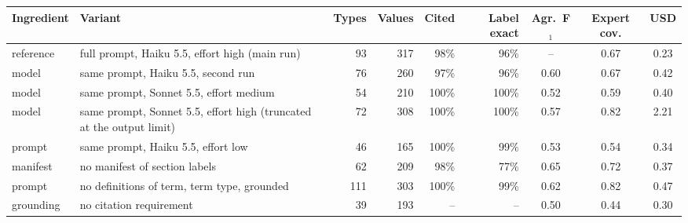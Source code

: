 \begin{tabular}{llrrrrccc}
\toprule
Ingredient & Variant & Types & Values & Cited & Label exact & Agr.\ F$_1$ & Expert cov. & USD \\
\midrule
reference & full prompt, Haiku 5.5, effort high (main run) & 93 & 317 & 98\% & 96\% & -- & 0.67 & 0.23 \\
model & same prompt, Haiku 5.5, second run & 76 & 260 & 97\% & 96\% & 0.60 & 0.67 & 0.42 \\
model & same prompt, Sonnet 5.5, effort medium & 54 & 210 & 100\% & 100\% & 0.52 & 0.59 & 0.40 \\
model & same prompt, Sonnet 5.5, effort high (truncated at the output limit) & 72 & 308 & 100\% & 100\% & 0.57 & 0.82 & 2.21 \\
prompt & same prompt, Haiku 5.5, effort low & 46 & 165 & 100\% & 99\% & 0.53 & 0.54 & 0.34 \\
manifest & no manifest of section labels & 62 & 209 & 98\% & 77\% & 0.65 & 0.72 & 0.37 \\
prompt & no definitions of term, term type, grounded & 111 & 303 & 100\% & 99\% & 0.62 & 0.82 & 0.47 \\
grounding & no citation requirement & 39 & 193 & -- & -- & 0.50 & 0.44 & 0.30 \\
\bottomrule
\end{tabular}
